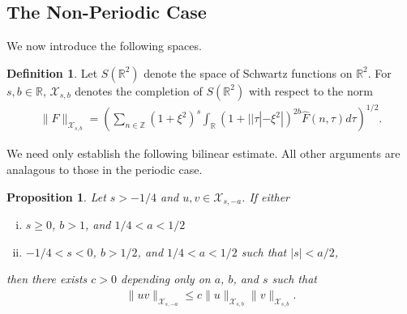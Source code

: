 \documentclass[12pt,reqno]{amsart}
\numberwithin{equation}{section}  %
\numberwithin{figure}{section}
\newcommand{\rr}{\mathbb{R}}
\newcommand{\zz}{\mathbb{Z}}
\newcommand{\wh}{\widehat}
\theoremstyle{plain}
\newtheorem{proposition}{Proposition}
\theoremstyle{definition}
\newtheorem{definition}{Definition}
\theoremstyle{remark}
\begin{document}
\subsection{The Non-Periodic Case} 
\label{ssec:non-periodic-case}
We now introduce the following spaces. 
%
%
\begin{definition}
  Let $S(\rr^{2})$ denote the space of Schwartz functions on
  $\rr^{2}$.  For $s, b \in \rr$, $\mathcal{X}_{s,b}$
  denotes the completion of $S(\rr^{2})$ with
  respect to the norm
  \begin{equation}
  \begin{split}
    \|F\|_{\mathcal{X}_{s,b}} = \left( \sum_{n \in \zz} (1 + \xi^{2})^{s} \int_{\rr}
    (1 + | | \tau | - \xi^{2} |)^{2b} \wh{F}(n, \tau) d \tau\right)^{1/2}.
  \end{split}
  \label{eqn:bous-norm-real}
  \end{equation}
\end{definition}
%
%
We need only establish the following bilinear estimate. All other arguments are
analagous to those in the periodic case.
%
\begin{proposition}
\label{prop:bilin-est-real}
  Let $s > -1/4$ and $u,v \in \mathcal{X}_{s, -a}$. If either
  \begin{enumerate}[(i)]
   \item{$s \ge 0$, $b > 1$, and $1/4 < a< 1/2$ }
     \label{first-it-real}
   \item{ $-1/4 < s< 0$, $b > 1/2$, and $1/4 < a < 1/2$ such that $| s | <
     a/2$,}
     \label{sec-item-real}
  \end{enumerate}
 then there exists $c > 0$ depending only on $a$, $b$, and $s$ such that
  \begin{equation*}
  \begin{split}
    \| uv \|_{\mathcal{X}_{s,-a}} \le c \| u \|_{\mathcal{X}_{s,b}} \| v \|_{\mathcal{X}_{s,b}}.
  \end{split}
  \end{equation*}
\end{proposition}
\end{document}
